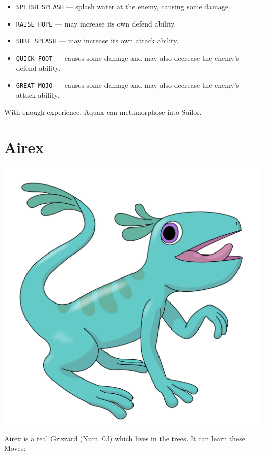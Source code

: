 \documentclass[10pt,twocolumn,openany,article]{memoir}
\begin{document}
\begin{itemize}
\item  \texttt{SPLISH SPLASH}  --- splash  water at  the enemy,  causing
  some damage. 
\item \texttt{RAISE HOPE} --- may increase its own defend ability.
\item \texttt{SURE SPLASH} --- may increase its own attack ability.
\item \texttt{QUICK FOOT}  --- causes some damage and  may also decrease
  the enemy's defend ability.
\item \texttt{GREAT MOJO}  --- causes some damage and  may also decrease
  the enemy's attack ability.
\end{itemize}

With enough experience, Aquax can metamorphose into Sailor.

\ifdefined\DEMO\else

\section{Airex}

\includegraphics[width=\columnwidth]{../Manual/Airex.png}

Airex is  a teal  Grizzard (Num. 03)  which lives in  the trees.  It can
learn these Moves:
\end{document}
